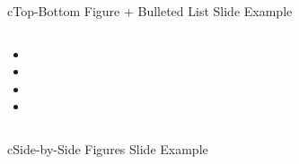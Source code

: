 \begin{myslide}{c}{Top-Bottom Figure + Bulleted List Slide Example}


\myspace

\begin{columns}

\begin{column}{1\textwidth}

\begin{itemize}

\item \lipsum[1][1-2]

\item \lipsum[1][3]

\item \lipsum[1][4-5]

\item \lipsum[1][6]

\end{itemize}

\end{column}

\end{columns}

\end{myslide}

\begin{myslide}{c}{Side-by-Side Figures Slide Example}

\begin{columns}



\end{columns}

\end{myslide}

